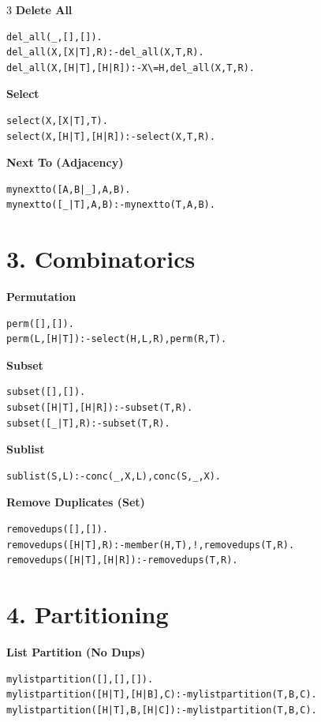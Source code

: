\documentclass[8pt,landscape]{article}
\begin{document}
\begin{multicols*}{3}
\textbf{Delete All}
\begin{lstlisting}
del_all(_,[],[]).
del_all(X,[X|T],R):-del_all(X,T,R).
del_all(X,[H|T],[H|R]):-X\=H,del_all(X,T,R).
\end{lstlisting}

\textbf{Select}
\begin{lstlisting}
select(X,[X|T],T).
select(X,[H|T],[H|R]):-select(X,T,R).
\end{lstlisting}

\textbf{Next To (Adjacency)}
\begin{lstlisting}
mynextto([A,B|_],A,B).
mynextto([_|T],A,B):-mynextto(T,A,B).
\end{lstlisting}

\section*{3. Combinatorics}

\textbf{Permutation}
\begin{lstlisting}
perm([],[]).
perm(L,[H|T]):-select(H,L,R),perm(R,T).
\end{lstlisting}

\textbf{Subset}
\begin{lstlisting}
subset([],[]).
subset([H|T],[H|R]):-subset(T,R).
subset([_|T],R):-subset(T,R).
\end{lstlisting}

\textbf{Sublist}
\begin{lstlisting}
sublist(S,L):-conc(_,X,L),conc(S,_,X).
\end{lstlisting}

\textbf{Remove Duplicates (Set)}
\begin{lstlisting}
removedups([],[]).
removedups([H|T],R):-member(H,T),!,removedups(T,R).
removedups([H|T],[H|R]):-removedups(T,R).
\end{lstlisting}

\section*{4. Partitioning}

\textbf{List Partition (No Dups)}
\begin{lstlisting}
mylistpartition([],[],[]).
mylistpartition([H|T],[H|B],C):-mylistpartition(T,B,C).
mylistpartition([H|T],B,[H|C]):-mylistpartition(T,B,C).
\end{lstlisting}


\end{multicols*}
\end{document}
